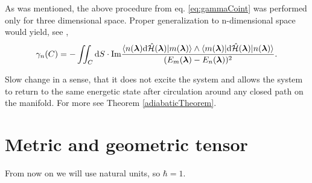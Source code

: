 As was mentioned, the above procedure from eq. \ref{eq:gammaCoint} was performed only for three dimensional space. Proper generalization to n-dimensional space would yield, see \citep{berry1984},
\begin{equation}
    \gamma_n(C) = -\iint_C \mathrm{d} S \cdot\textrm{Im} \frac{
            \braket{n({\bm\lambda})\mathrm{d} \hat{\mathcal{H}}({\bm\lambda}) |m({\bm\lambda})}\wedge \braket{m({\bm\lambda})|\mathrm{d}\hat{\mathcal{H}}({\bm\lambda})|n({\bm\lambda})}    
             }{
(E_m({\bm\lambda})-E_n({\bm\lambda}))^2
             }.
\end{equation}




\begin{definition}[Adibaticity]
    Slow change in a sense, that it does not excite the system and allows the system to return to the same energetic state after circulation around any closed path on the manifold. For more see Theorem \ref{adiabaticTheorem}.
\end{definition}




\section{Metric and geometric tensor}
From now on we will use natural units, so $\hbar=1$.

